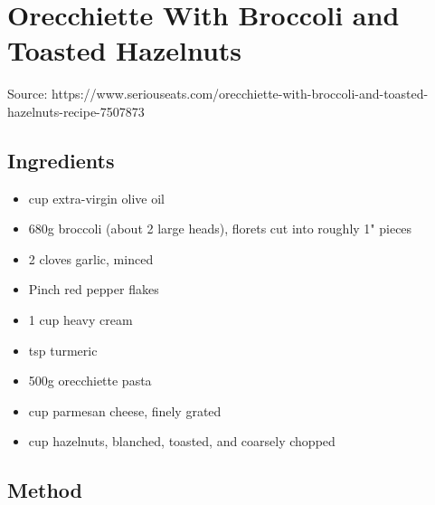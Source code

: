 \section{Orecchiette With Broccoli and Toasted Hazelnuts}


Source: https://www.seriouseats.com/orecchiette-with-broccoli-and-toasted-hazelnuts-recipe-7507873

\subsection{Ingredients}

\begin{itemize}
    \item {} cup extra-virgin olive oil
    \item 680g broccoli (about 2 large heads), florets cut into roughly 1" pieces
    \item 2 cloves garlic, minced
    \item Pinch red pepper flakes
    \item 1 cup heavy cream
    \item {} tsp turmeric
    \item 500g orecchiette pasta
    \item {} cup parmesan cheese, finely grated
    \item {} cup hazelnuts, blanched, toasted, and coarsely chopped
\end{itemize}

\subsection{Method}

